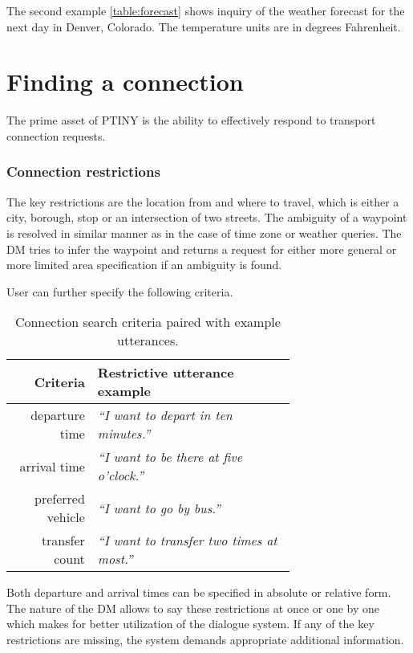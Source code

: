 The second example \ref{table:forecast} shows inquiry of the weather forecast for the next day in Denver, Colorado.
The temperature units are in degrees Fahrenheit.

\section{Finding a connection}

The prime asset of \ac{PTINY} is the ability to effectively respond to transport connection requests.

\subsubsection{Connection restrictions}

The key restrictions are the location from and where to travel, which is either a city, borough, stop or an intersection of two streets.
The ambiguity of a waypoint is resolved in similar manner as in the case of time zone or weather queries.
The \ac{DM} tries to infer the waypoint and returns a request for either more general or more limited area specification if an ambiguity is found.

User can further specify the following criteria.

\begin{table}[h]
\centering
\begin{tabular}{ r | p{0.7\linewidth} }
	\textbf{Criteria} & \textbf{Restrictive utterance example} \\ \hline
	departure time & \textit{``I want to depart in ten minutes.''} \\
	arrival time & \textit{``I want to be there at five o'clock.''} \\
	preferred vehicle & \textit{``I want to go by bus.''} \\
	transfer count & \textit{``I want to transfer two times at most.''}
\end{tabular}
\caption[Restrictive criteria specification]{Connection search criteria paired with example utterances.}
\label{table:attributes}
\end{table}

Both departure and arrival times can be specified in absolute or relative form.
The nature of the \ac{DM} allows to say these restrictions at once or one by one which makes for better utilization of the dialogue system.
If any of the key restrictions are missing, the system demands appropriate additional information.

